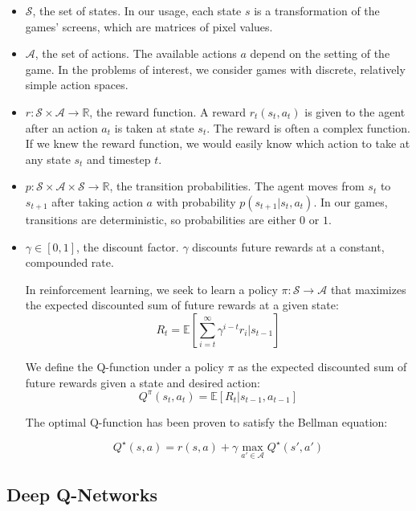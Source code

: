 \documentclass[11pt, twocolumn]{article}
\begin{document}
\begin{itemize}
\item $\mathcal{S}$, the set of states. In our usage, each state $s$
is a transformation of the games' screens, which are matrices of pixel
values.
  
\item $\mathcal{A}$, the set of actions. The available actions $a$
depend on the setting of the game. In the problems of interest, we
consider games with discrete, relatively simple action spaces.
  
\item $r: \mathcal{S} \times \mathcal{A} \to \mathbb{R}$, the reward
function. A reward $r_t(s_t, a_t)$ is given to the agent after an
action $a_t$ is taken at state $s_t$. The reward is often a complex
function. If we knew the reward function, we would easily know which
action to take at any state $s_t$ and timestep $t$.
  
\item $p: \mathcal{S} \times \mathcal{A} \times \mathcal{S} \to
\mathbb{R}$, the transition probabilities. The agent moves from $s_t$
to $s_{t+1}$ after taking action $a$ with probability $p(s_{t+1} |s_t,
a_t)$. In our games, transitions are deterministic, so probabilities
are either $0$ or $1$.
  
\item $\gamma \in [0, 1]$, the discount factor. $\gamma$ discounts
  future rewards at a constant, compounded rate.

  In reinforcement learning, we seek to learn a policy
  $\pi: \mathcal{S} \to \mathcal{A}$ that maximizes the expected
  discounted sum of future rewards at a given
  state:
  $$R_t = \mathbb{E}\left[\sum_{i=t}^\infty \gamma^{i-t} r_{i}|s_{t-1}\right]$$

  We define the Q-function under a policy $\pi$ as the expected
  discounted sum of future rewards given a state and desired action:
  $$Q^\pi(s_t, a_t) = \mathbb{E}\left[R_t | s_{t-1}, a_{t-1} \right]$$

  The optimal Q-function has been proven to satisfy the Bellman equation:

  $$Q^\star (s, a) = r(s, a) + \gamma \max_{a' \in \mathcal{A}} Q^\star(s', a')$$
\end{itemize}


\subsection{Deep Q-Networks}
\end{document}
